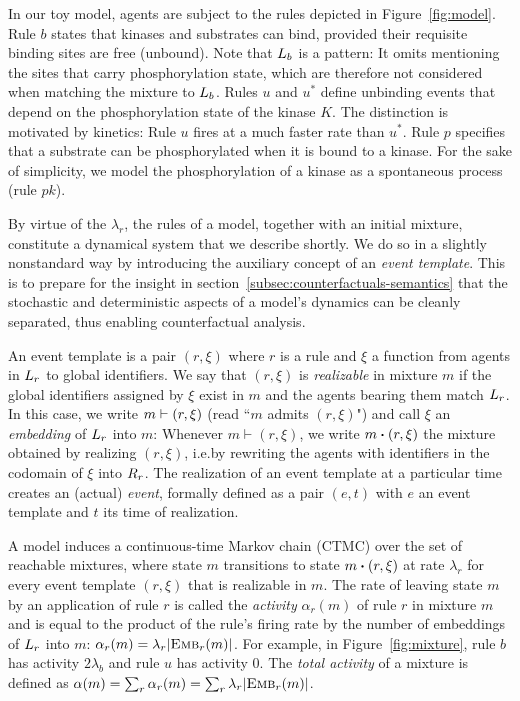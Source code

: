 

In our toy model, agents are subject to the rules depicted in
Figure~\ref{fig:model}. Rule $b$ states that kinases and substrates
can bind, provided their requisite binding sites are free
(unbound). Note that $L_{b}$ is a pattern: It omits mentioning the
sites that carry phosphorylation state, which are therefore not
considered when matching the mixture to $L_{b}$. Rules $u$ and
$u^{*}$ define unbinding events that depend on the phosphorylation
state of the kinase $K$. The distinction is motivated by kinetics:
Rule $u$ fires at a much faster rate than $u^{*}$. Rule $p$ specifies
that a substrate can be phosphorylated when it is bound to a
kinase. For the sake of simplicity, we model the phosphorylation of a
kinase as a spontaneous process (rule $pk$).

By virtue of the $\lambda_r$, the rules of a model, together with an
initial mixture, constitute a dynamical system that we describe
shortly. We do so in a slightly nonstandard way by introducing the
auxiliary concept of an \emph{event template}. This is to prepare for
the insight in section~\ref{subsec:counterfactuals-semantics} that the
stochastic and deterministic aspects of a model's dynamics can be
cleanly separated, thus enabling counterfactual analysis.

An event template is a pair $(r, \xi)$ where $r$ is a rule and $\xi$ a
function from agents in $L_{r}$ to global identifiers. We say that
$(r, \xi)$ is \emph{realizable} in mixture $m$ if the global
identifiers assigned by $\xi$ exist in $m$ and the agents bearing them
match $L_{r}$. In this case, we write $m \vdash (r, \xi)$
(read ``$m$ admits $(r, \xi)$") and call $\xi$ an \emph{embedding} of
$L_{r}$ into $m$:
  Whenever $m \vdash (r, \xi)$, we
write $\UPDATE{m}{(r, \xi)}$ the mixture obtained by
realizing $(r, \xi)$, i.e.\@ by rewriting the agents with identifiers
in the codomain of $\xi$ into $R_{r}$. The realization of an event
template at a particular time creates an (actual) \emph{event},
formally defined as a pair $(e, t)$ with $e$ an event template and $t$
its time of realization.

A model induces a continuous-time Markov chain (CTMC) over the
set of reachable mixtures, where state $m$ transitions to state
$\UPDATE{m}{(r, \xi)}$ at rate $\lambda_r$ for every event template
$(r, \xi)$ that is realizable in $m$. The rate of leaving state $m$ by
an application of rule $r$ is called the \emph{activity} $\alpha_r(m)$
of rule $r$ in
mixture $m$ and is equal to the product of the rule's firing rate by
the number of embeddings of $L_{r}$ into $m$:
$\alpha_r(m)=\lambda_r|{\textsc{Emb}}_{r}(m)|$. For example, in
Figure~\ref{fig:mixture}, rule $b$ has activity $2\lambda_b$ and rule
$u$ has activity $0$. The \emph{total activity} of a mixture is defined
as $\alpha(m)=\sum_r\alpha_r(m)=\sum_r\lambda_r|{\textsc{Emb}}_{r}(m)|$.


